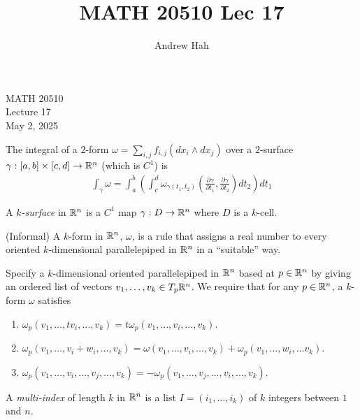 \documentclass[11pt]{article}
\title{MATH 20510 Lec 17}
\author{Andrew Hah}
\begin{document}
\pagestyle{plain}
\begin{center}
{\Large MATH 20510} \\
{\Large Lecture 17} \\
\vspace{.2in}
May 2, 2025
\end{center}

\begin{definition} The integral of a $2$-form $\omega = \sum_{i, j} f_{i, j} (dx_i \wedge dx_j)$ over a $2$-surface $\gamma : [a, b] \times [c, d] \to \mathbb{R}^n$ (which is $C^1$) is \begin{align*} \int_{\gamma} \omega = \int_a^b \left( \int_c^d \omega_{\gamma(t_1, t_2)} \left( \frac{\partial \gamma}{\partial t_1}, \frac{\partial \gamma}{\partial t_2} \right)  dt_2 \right) dt_1 \end{align*}
\end{definition}

\begin{definition} A \emph{$k$-surface} in $\mathbb{R}^n$ is a $C^1$ map $\gamma: D \to \mathbb{R}^n$ where $D$ is a $k$-cell.
\end{definition}

\begin{definition} (Informal) A $k$-form in $\mathbb{R}^n$, $\omega$, is a rule that assigns a real number to every oriented $k$-dimensional parallelepiped in $\mathbb{R}^n$ in a ``suitable'' way.
\end{definition}

Specify a $k$-dimensional oriented parallelepiped in $\mathbb{R}^n$ based at $p \in \mathbb{R}^n$ by giving an ordered list of vectors $v_1, \dots, v_k \in T_p\mathbb{R}^n$. We require that for any $p \in \mathbb{R}^n$, a $k$-form $\omega$ satisfies
\begin{enumerate}
\item $\omega_p(v_1, \dots, tv_i, \dots,  v_k) = t \omega_p (v_1, \dots, v_i, \dots,  v_k)$.
\item $\omega_p(v_1, \dots, v_i + w_i, \dots, v_k) = \omega(v_1, \dots, v_i, \dots, v_k) + \omega_p (v_1, \dots, w_i, \dots v_k)$.
\item $\omega_p(v_1, \dots, v_i, \dots, v_j, \dots, v_k) = - \omega_p(v_1, \dots, v_j, \dots, v_i, \dots, v_k)$.
\end{enumerate}

\begin{definition} A \emph{multi-index} of length $k$ in $\mathbb{R}^n$ is a list $I = (i_1, \dots, i_k)$ of $k$ integers between $1$ and $n$.
\end{definition}
\end{document}
